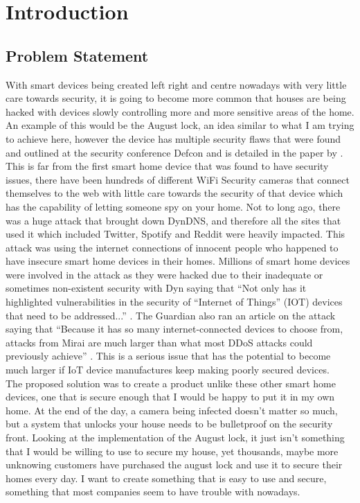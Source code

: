 \chapter{Introduction}
\label{chap:intro}

\section{Problem Statement}
With smart devices being created left right and centre nowadays with very little care towards security, it is going to become more common that houses are being hacked with devices slowly controlling more and more sensitive areas of the home. An example of this would be the August lock, an idea similar to what I am trying to achieve here, however the device has multiple security flaws that were found and outlined at the security conference Defcon and is detailed in the paper by \cite{Fuller2017}. This is far from the first smart home device that was found to have security issues, there have been hundreds of different WiFi Security cameras that connect themselves to the web with little care towards the security of that device which has the capability of letting someone spy on your home. Not to long ago, there was a huge attack that brought down DynDNS, and therefore all the sites that used it which included Twitter, Spotify and Reddit were heavily impacted. This attack was using the internet connections of innocent people who happened to have insecure smart home devices in their homes. Millions of smart home devices were involved in the attack as they were hacked due to their inadequate or sometimes non-existent security with Dyn saying that ``Not only has it highlighted vulnerabilities in the security of ``Internet of Things'' (IOT) devices that need to be addressed...'' \citep{Hilton2016}. The Guardian also ran an article on the attack saying that ``Because it has so many internet-connected devices to choose from, attacks from Mirai are much larger than what most DDoS attacks could previously achieve'' \citep{Woolf2016}. This is a serious issue that has the potential to become much larger if IoT device manufactures keep making poorly secured devices.
\\
\indent The proposed solution was to create a product unlike these other smart home devices, one that is secure enough that I would be happy to put it in my own home. At the end of the day, a camera being infected doesn't matter so much, but a system that unlocks your house needs to be bulletproof on the security front. Looking at the implementation of the August lock, it just isn't something that I would be willing to use to secure my house, yet thousands, maybe more unknowing customers have purchased the august lock and use it to secure their homes every day. I want to create something that is easy to use and secure, something that most companies seem to have trouble with nowadays.
